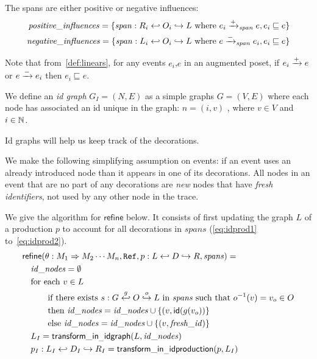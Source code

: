 The spans are either positive or negative influences:
\begin{align*}
  \mathit{positive\_influences} = \{ \mathit{span}:R_i\hookleftarrow O_i\hookrightarrow L \text{ where } e_i\mathrel{\xrightarrow{+}}_{\mathit{span}} e, e_i\sqsubseteq e\} \\
  \mathit{negative\_influences} = \{ \mathit{span}:L_i\hookleftarrow O_i\hookrightarrow L \text{ where } e\mathrel{\xrightarrow{-}}_{\mathit{span}} e_i, e_i\sqsubseteq e\}
\end{align*}

Note that from~\autoref{def:linears}, for any events $e_i$,$e$ in an augmented poset, if $e_i\mathrel{\xrightarrow{+}} e$ or $e\mathrel{\xrightarrow{-}}e_i$ then $e_i\sqsubseteq e$.

\begin{definition}[Id graphs]
  We define an \emph{id graph} $G_I = (N,E)$ as a simple graphs $G = (V,E)$ where each node has associated an id unique in the graph: $n=(i,v)$ , where $v\in V$ and $i\in\mathbb{N}$.
\end{definition}

Id graphs will help us keep track of the decorations.

\begin{remark}
  We make the following simplifying assumption on events: if an event uses an already introduced node than it appears in one of its decorations. All nodes in an event that are no part of any decorations are \emph{new} nodes that have \emph{fresh identifiers}, not used by any other node in the trace.
\end{remark}

We give the algorithm for $\mathsf{refine}$ below. It consists of first updating the graph $L$ of a production $p$ to account for all decorations in $\mathit{spans}$ (\autoref{eq:idprod1} to~\autoref{eq:idprod2}).
\begin{align}
  &\mathsf{refine}(\theta:M_1\Rightarrow M_2\cdots M_n,\mathtt{Ref},p:L\hookleftarrow D\hookrightarrow R,\mathit{spans}) = \\
  \label{eq:idprod1}
  &\quad\mathit{id\_nodes} = \emptyset\\
  &\quad\text{for each }v\in L\\
  &\quad\qquad\text{if there exists }s:G\overset{g}{\hookleftarrow}O\overset{o}{\hookrightarrow}L\text{ in }\mathit{spans}\text{ such that }
  o^{-1}(v)=v_o\in O\\
  &\quad\qquad\text{then }\mathit{id\_nodes} =\mathit{id\_nodes} \cup\{(v,\mathsf{id}(g(v_o))\}\\
  &\quad\qquad\text{else }\mathit{id\_nodes} =\mathit{id\_nodes} \cup\{(v,\mathit{fresh\_id})\}\\
  &\quad L_I = \mathsf{transform\_in_\_idgraph}(L,\mathit{id\_nodes})\\
  \label{eq:idprod2}
  &\quad p_I:L_I\hookleftarrow D_I\hookrightarrow R_I = \mathsf{transform\_in_\_idproduction}(p,L_I)\\
\end{align}


